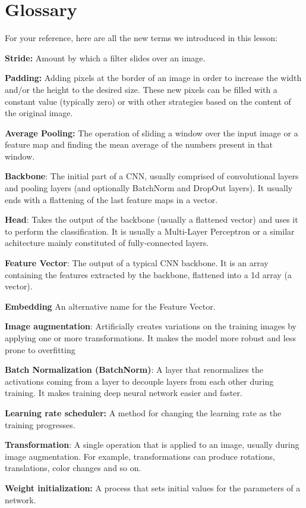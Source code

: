 \section{Glossary}

For your reference, here are all the new terms we introduced in this lesson:

\textbf{Stride:} Amount by which a filter slides over an image.

\textbf{Padding:} Adding pixels at the border of an image in order to increase the width and/or the height to the desired size. These new pixels can be filled with a constant value (typically zero) or with other strategies based on the content of the original image.

\textbf{Average Pooling:} The operation of sliding a window over the input image or a feature map and finding the mean average of the numbers present in that window.

\textbf{Backbone}: The initial part of a CNN, usually comprised of convolutional layers and pooling layers (and optionally BatchNorm and DropOut layers). It usually ends with a flattening of the last feature maps in a vector.

\textbf{Head}: Takes the output of the backbone (usually a flattened vector) and uses it to perform the classification. It is usually a Multi-Layer Perceptron or a similar achitecture mainly constituted of fully-connected layers.

\textbf{Feature Vector}: The output of a typical CNN backbone. It is an array containing the features extracted by the backbone, flattened into a 1d array (a vector).

\textbf{Embedding} An alternative name for the Feature Vector.

\textbf{Image augmentation}: Artificially creates variations on the training images by applying one or more transformations. It makes the model more robust and less prone to overfitting

\textbf{Batch Normalization (BatchNorm)}: A layer that renormalizes the activations coming from a layer to decouple layers from each other during training. It makes training deep neural network easier and faster.

\textbf{Learning rate scheduler:} A method for changing the learning rate as the training progresses.

\textbf{Transformation}: A single operation that is applied to an image, usually during image augmentation. For example, transformations can produce rotations, translations, color changes and so on.

\textbf{Weight initialization:} A process that sets initial values for the parameters of a network.
